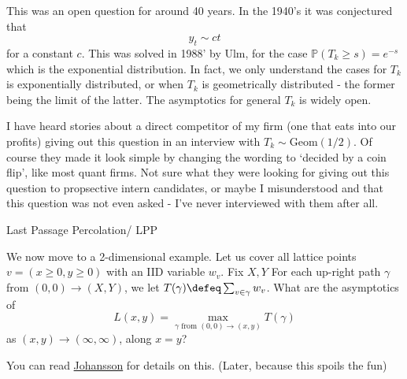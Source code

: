 This was an open question for around 40 years. In the 1940's it was conjectured that \[
y_t \sim ct
\]
for a constant $c$. This was solved in 1988' by Ulm, for the case $\mathbb{P}(T_k\geq s) = e^{-s}$ which is the exponential distribution. In fact, we only understand the cases for $T_k$ is exponentially distributed, or when $T_k$ is geometrically distributed - the former being the limit of the latter. The asymptotics for general $T_k$ is widely open.

\begin{remark}
    I have heard stories about a direct competitor of my firm (one that eats into our profits) giving out this question in an interview with $T_k \sim \text{Geom}(1/2)$. Of course they made it look simple by changing the wording to `decided by a coin flip', like most quant firms. Not sure what they were looking for giving out this question to propsective intern candidates, or maybe I misunderstood and that this question was not even asked - I've never interviewed with them after all.
\end{remark}

\begin{aexample}[breakable=false]{Last Passage Percolation/ LPP}{}
    
\begin{center}
    

\end{center}

We now move to a 2-dimensional example. Let us cover all lattice points $v=(x\geq 0,y\geq 0)$ with an IID variable $w_v$. Fix $X,Y$ For each up-right path $\gamma$ from $(0,0) \to (X,Y)$, we let $T(\gamma)\defeq \sum_{v\in \gamma} w_v$.
What are the asymptotics of \[
L(x,y) = \max_{\gamma \text{ from } (0,0)\to (x,y)} T(\gamma)
\]
as $(x,y)\to (\infty,\infty)$, along $x=y$?

\end{aexample}
\begin{remark}
    You can read \href{https://arxiv.org/pdf/math/9903134}{Johansson} for details on this. (Later, because this spoils the fun)
\end{remark}

